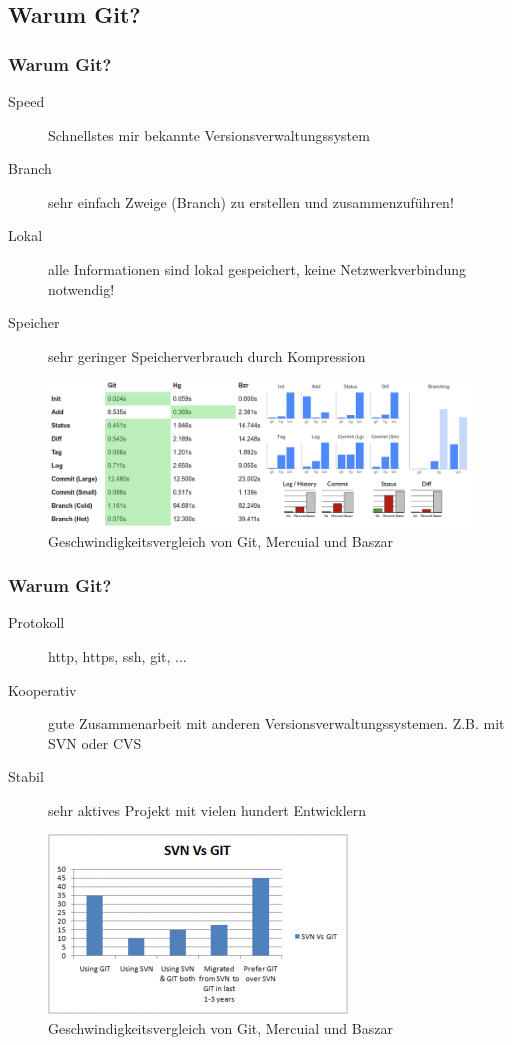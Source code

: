 \documentclass{beamer}
\begin{document}
\subsection{Warum Git?}

\begin{frame}\frametitle{Warum Git?}
\begin{description}
\item[Speed] Schnellstes mir bekannte Versionsverwaltungssystem 
\item[Branch] sehr einfach Zweige (Branch) zu erstellen und zusammenzuführen!
\item[Lokal] alle Informationen sind lokal gespeichert, keine Netzwerkverbindung notwendig!
\item[Speicher] sehr geringer Speicherverbrauch durch Kompression
\end{description}

\begin{figure}
\includegraphics[scale=0.25]{Bilder/speed2} 
\caption{Geschwindigkeitsvergleich von Git, Mercuial und Baszar}
\end{figure}
\end{frame}

\begin{frame}\frametitle{Warum Git?}
\begin{description}
\item[Protokoll] http, https, ssh, git, ...
\item[Kooperativ] gute Zusammenarbeit mit anderen Versionsverwaltungssystemen. Z.B. mit SVN oder CVS
\item[Stabil] sehr aktives Projekt mit vielen hundert Entwicklern
\end{description}

\begin{figure}
\includegraphics[scale=0.5]{Bilder/svnvsgit1} 
\caption{Geschwindigkeitsvergleich von Git, Mercuial und Baszar}
\end{figure}
\end{frame}
\end{document}
